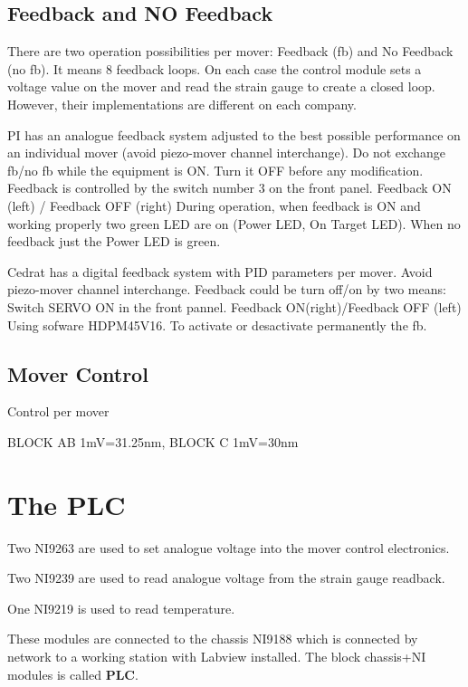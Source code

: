 \subsection{Feedback and NO Feedback}
There are two operation possibilities per mover: Feedback (fb) and No Feedback (no fb). It means 8 feedback loops. On each case the control module sets a voltage value on the mover and read the strain gauge to create a closed loop. However, their implementations are different on each company.

PI has an analogue feedback system adjusted to the best possible performance on an individual mover (avoid piezo-mover channel interchange). Do not exchange fb/no fb while the equipment is ON. Turn it OFF before any modification. 
Feedback is controlled by the switch number 3  on the front panel. 
Feedback ON (left) / Feedback OFF (right)
During operation, when feedback is ON and working properly two green LED are on (Power LED, On Target LED). When no feedback just the Power LED is green.

Cedrat has a digital feedback system with PID parameters per mover. Avoid piezo-mover channel interchange. Feedback could be turn off/on by two means:
Switch SERVO ON in the front pannel. Feedback ON(right)/Feedback OFF (left)
Using sofware  HDPM45V16. To activate or desactivate permanently the fb.

\subsection{Mover Control}
Control per mover\par
\begin{center}
\end{center}
{\tiny BLOCK AB 1mV=31.25nm, BLOCK C 1mV=30nm}\par

\section{The PLC}
Two NI9263 are used to set analogue voltage into the mover control electronics.\par
Two NI9239 are used to read analogue voltage from the strain gauge readback.\par
One NI9219 is used to read temperature.\par
These modules are connected to the chassis NI9188 which is connected by network to a working station with Labview installed.
The block chassis+NI modules is called \textbf{PLC}.\par

